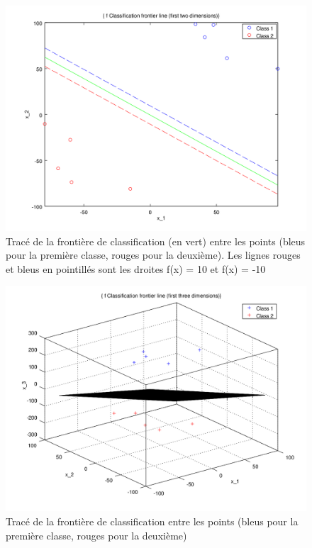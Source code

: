 \documentclass{article}
\begin{document}
         \begin{figure}
           \begin{center}
             \includegraphics[scale=0.5]{images/line1.png}
             \caption{Tracé de la frontière de classification (en vert) entre les points (bleus pour la première classe, rouges pour la deuxième). Les lignes rouges et bleus en pointillés sont les droites f(x) = 10 et f(x) = -10}
           \end{center}
         \end{figure}

         \begin{figure}
           \begin{center}
             \includegraphics[scale=0.5]{images/plane1.png}
             \caption{Tracé de la frontière de classification entre les points (bleus pour la première classe, rouges pour la deuxième)}
           \end{center}
         \end{figure}
\end{document}
